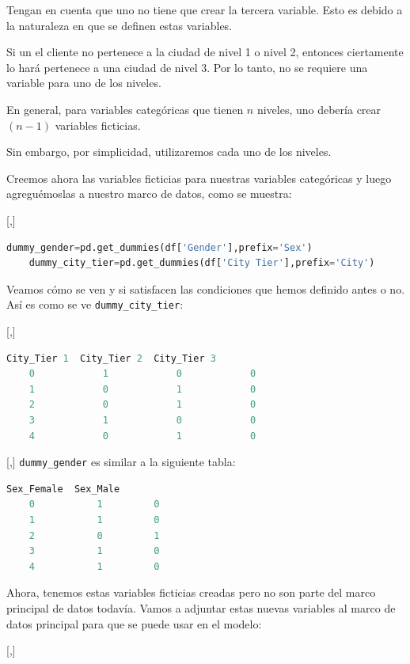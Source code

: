 Tengan en cuenta que uno no tiene que crear la tercera variable. Esto es
debido a la naturaleza en que se definen estas variables.


Si un
el cliente no pertenece a la ciudad de nivel 1 o nivel 2, entonces ciertamente lo hará
pertenece a una ciudad de nivel 3. Por lo tanto, no se requiere una variable para uno de
los niveles.


\begin{observacion}
	En general, para variables categóricas que tienen $n$ niveles, uno
	debería crear $(n-1)$ variables ficticias.
\end{observacion}

Sin embargo, por simplicidad, utilizaremos cada uno de los niveles.


Creemos ahora las variables ficticias para nuestras
variables categóricas y luego agreguémoslas a nuestro marco de datos, como se muestra:


[,]{}

\begin{lstlisting}[language=Python]
	dummy_gender=pd.get_dummies(df['Gender'],prefix='Sex')
	dummy_city_tier=pd.get_dummies(df['City Tier'],prefix='City')
\end{lstlisting}


Veamos cómo se ven y si satisfacen las condiciones que hemos definido
antes o no. Así es como se ve \texttt{dummy\_city\_tier}:

[,]{}
\begin{lstlisting}[language=Python]
	City_Tier 1  City_Tier 2  City_Tier 3
	0            1            0            0
	1            0            1            0
	2            0            1            0
	3            1            0            0
	4            0            1            0
\end{lstlisting}

[,]{}
\texttt{dummy\_gender} es similar a la siguiente tabla:
\begin{lstlisting}[language=Python]
	Sex_Female  Sex_Male
	0           1         0
	1           1         0
	2           0         1
	3           1         0
	4           1         0
\end{lstlisting}


Ahora, tenemos estas variables ficticias creadas pero no son parte del
marco principal de datos todavía. Vamos a adjuntar estas nuevas variables al marco de datos principal para que
se puede usar en el modelo:

[,]{}

